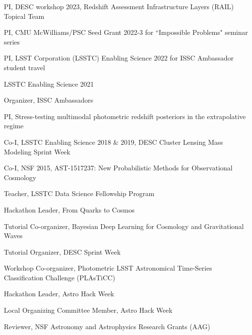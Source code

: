 \documentclass[11pt,letterpaper]{article}
\begin{document}
 \begin{list}{}{\malzlist}
 \item PI, DESC workshop 2023, Redshift Assessment Infrastructure Layers (RAIL) Topical Team
 \item PI, CMU McWilliams/PSC Seed Grant 2022-3 for ``Impossible Problems" seminar series
 \item PI, LSST Corporation (LSSTC) Enabling Science 2022 for ISSC Ambassador student travel
 \item LSSTC Enabling Science 2021
\begin{list}{}{\malzlist}
	\item Organizer, ISSC Ambassadors 
	\item PI, Stress-testing multimodal photometric redshift posteriors in the extrapolative regime
\end{list}
 \item Co-I, LSSTC Enabling Science 2018 \& 2019, DESC Cluster Lensing Mass Modeling Sprint Week%
\item Co-I, NSF 2015, AST-1517237: New Probabilistic Methods for Observational Cosmology
\end{list}

%
\clearpage

\nopagebreak\begin{list}{}{\malzlist}
	\item Teacher, LSSTC Data Science Fellowship Program 
	\item Hackathon Leader, From Quarks to Cosmos 
	\item Tutorial Co-organizer, Bayesian Deep Learning for Cosmology and Gravitational Waves 
	\item Tutorial Organizer, DESC Sprint Week 
	\item Workshop Co-organizer, Photometric LSST Astronomical Time-Series Classification Challenge (PLAsTiCC) 
	\item Hackathon Leader, Astro Hack Week 
	\item Local Organizing Committee Member, Astro Hack Week 
	\item Reviewer, NSF Astronomy and Astrophysics Research Grants (AAG) 
\end{list}
\end{document}
